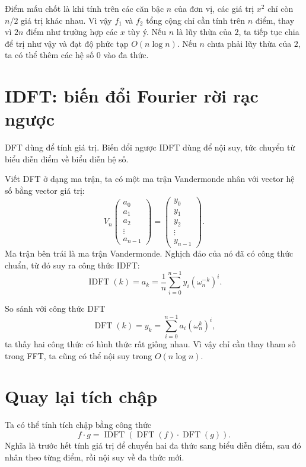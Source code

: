 \documentclass[11pt]{article}
\begin{document}
Điểm mấu chốt là khi tính trên các căn bậc $n$ của đơn vị, các giá trị $x^2$
chỉ còn $n/2$ giá trị khác nhau. Vì vậy $f_1$ và $f_2$ tổng cộng chỉ cần tính
trên $n$ điểm, thay vì $2n$ điểm như trường hợp các $x$ tùy ý. Nếu $n$ là lũy
thừa của $2$, ta tiếp tục chia để trị như vậy và đạt độ phức tạp
$O(n\log n)$. Nếu $n$ chưa phải lũy thừa của $2$, ta có thể thêm các hệ số
$0$ vào đa thức.

\section{IDFT: biến đổi Fourier rời rạc ngược}

DFT dùng để tính giá trị. Biến đổi ngược IDFT dùng để nội suy, tức chuyển từ
biểu diễn điểm về biểu diễn hệ số.

Viết DFT ở dạng ma trận, ta có một ma trận Vandermonde nhân với vector hệ số
bằng vector giá trị:
\[
  V_n
  \begin{pmatrix}
    a_0\\a_1\\a_2\\ \vdots \\ a_{n-1}
  \end{pmatrix}
  =
  \begin{pmatrix}
    y_0\\y_1\\y_2\\ \vdots \\ y_{n-1}
  \end{pmatrix}.
\]
Ma trận bên trái là ma trận Vandermonde. Nghịch đảo của nó đã có công thức
chuẩn, từ đó suy ra công thức IDFT:
\[
  \operatorname{IDFT}(k)=a_k
  =\frac{1}{n}\sum_{i=0}^{n-1} y_i(\omega_n^{-k})^i.
\]

So sánh với công thức DFT
\[
  \operatorname{DFT}(k)=y_k=\sum_{i=0}^{n-1} a_i(\omega_n^k)^i,
\]
ta thấy hai công thức có hình thức rất giống nhau. Vì vậy chỉ cần thay tham số
trong FFT, ta cũng có thể nội suy trong $O(n\log n)$.

\section{Quay lại tích chập}

Ta có thể tính tích chập bằng công thức
\[
  f\cdot g = \operatorname{IDFT}(\operatorname{DFT}(f)\cdot
  \operatorname{DFT}(g)).
\]
Nghĩa là trước hết tính giá trị để chuyển hai đa thức sang biểu diễn điểm, sau
đó nhân theo từng điểm, rồi nội suy về đa thức mới.
\end{document}
